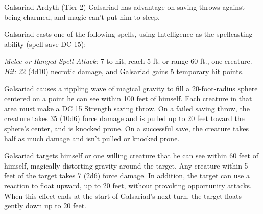 \documentclass[10pt,a4paper,twoside,bg=print,twocolumn,openany,nodeprecatedcode]{dndbook}
\begin{document}
\begin{DndMonster}[float=t]{Galsariad Ardyth (Tier 2)}
\DndMonsterBasics[
armor-class = {12},
hit-points = {\DndDice{15d8}},
speed = {30 ft., fly 30 ft. \textit{(hover)}}
]
\DndMonsterAbilityScores[
 str = 8,
 dex = 14,
 con = 10,
 int = 18,
 wis = 15,
 cha = 12
]
\DndMonsterDetails[
saving-throws = {Int +7, Wis +5},
skills = {Arcana +7, Investigation +7, Nature +7},
senses = {darkvision 120 ft., passive perception 12},
languages = {Common, Draconic, Undercommon},
challenge = 5,
]
Galsariad has advantage on saving throws against being charmed, and magic can't put him to sleep.

Galsariad casts one of the following spells, using Intelligence as the spellcasting ability (spell save DC 15):
\begin{DndMonsterSpells}
\end{DndMonsterSpells}
\textsl{Melee or Ranged Spell Attack:} 7 to hit, reach 5 ft. or range 60 ft., one creature. \textsl{Hit:} 22 (4d10) necrotic damage, and Galsariad gains 5 temporary hit points.

Galsariad causes a rippling wave of magical gravity to fill a 20-foot-radius sphere centered on a point he can see within 100 feet of himself. Each creature in that area must make a DC 15 Strength saving throw. On a failed saving throw, the creature takes 35 (10d6) force damage and is pulled up to 20 feet toward the sphere's center, and is knocked prone. On a successful save, the creature takes half as much damage and isn't pulled or knocked prone.

Galsariad targets himself or one willing creature that he can see within 60 feet of himself, magically distorting gravity around the target. Any creature within 5 feet of the target takes 7 (2d6) force damage. In addition, the target can use a reaction to float upward, up to 20 feet, without provoking opportunity attacks. When this effect ends at the start of Galsariad's next turn, the target floats gently down up to 20 feet.

\end{DndMonster}
\end{document}

